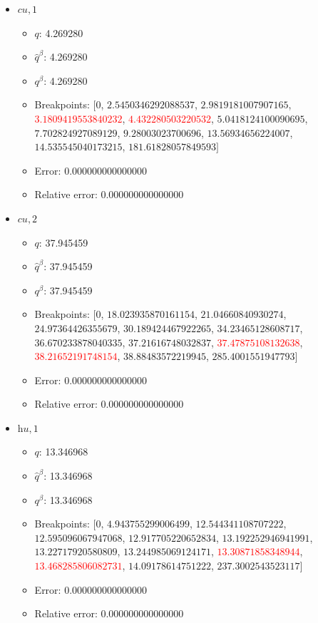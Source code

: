 \documentclass{article}%
\begin{document}
\begin{itemize}
\begin{itemize}
		\item Error: 0.000000000000000%
		\item Relative error: 0.000000000000000%
	\end{itemize}%
	\item $\textit{cu},1$%
	\begin{itemize}%
		\item $q$: 4.269280%
		\item $\hat{q}^\beta$: 4.269280%
		\item $q^\beta$: 4.269280%
		\item Breakpoints: $[$$0$, $2.5450346292088537$, $2.9819181007907165$, \textcolor{red}{$3.1809419553840232$}, \textcolor{red}{$4.432280503220532$}, $5.0418124100090695$, $7.702824927089129$, $9.28003023700696$, $13.56934656224007$, $14.535545040173215$, $181.61828057849593$$]$%
		\item Error: 0.000000000000000%
		\item Relative error: 0.000000000000000%
	\end{itemize}%
	\item $\textit{cu},2$%
	\begin{itemize}%
		\item $q$: 37.945459%
		\item $\hat{q}^\beta$: 37.945459%
		\item $q^\beta$: 37.945459%
		\item Breakpoints: $[$$0$, $18.023935870161154$, $21.04660840930274$, $24.97364426355679$, $30.189424467922265$, $34.23465128608717$, $36.670233878040335$, $37.21616748032837$, \textcolor{red}{$37.47875108132638$}, \textcolor{red}{$38.21652191748154$}, $38.88483572219945$, $285.4001551947793$$]$%
		\item Error: 0.000000000000000%
		\item Relative error: 0.000000000000000%
	\end{itemize}%
	\item $\textit{hu},1$%
	\begin{itemize}%
		\item $q$: 13.346968%
		\item $\hat{q}^\beta$: 13.346968%
		\item $q^\beta$: 13.346968%
		\item Breakpoints: $[$$0$, $4.943755299006499$, $12.544341108707222$, $12.595096067947068$, $12.917705220652834$, $13.192252946941991$, $13.22717920580809$, $13.244985069124171$, \textcolor{red}{$13.30871858348944$}, \textcolor{red}{$13.468285806082731$}, $14.09178614751222$, $237.3002543523117$$]$%
		\item Error: 0.000000000000000%
		\item Relative error: 0.000000000000000%
	\end{itemize}%
\end{itemize}%
\end{document}
